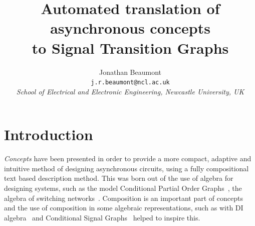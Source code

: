 \documentclass[british,conference,compsoc]{IEEEtran}
\newcommand{\noun}[1]{\textsc{#1}}
\begin{document}
\twocolumn

\title{Automated translation of asynchronous concepts \\
to Signal Transition Graphs}
\author{Jonathan Beaumont\\
\texttt{j.r.beaumont@ncl.ac.uk}\\
\emph{School of Electrical and Electronic Engineering, Newcastle University,
UK}}

\maketitle

%

\sloppy
\thispagestyle{empty}
\section{Introduction}

\emph{Concepts} have been presented in order to provide a more compact, adaptive and intuitive method of
designing asynchronous circuits, using a fully compositional text based description method. 
This was born out of the use of algebra for designing systems,
such as the model Conditional Partial Order Graphs~\cite{CPOG1}\cite{CPOG2}\cite{2014_mokhov_pg},
the algebra of switching networks~\cite{mokhov2015algebra}. Composition is an important part of concepts
 and the use of composition in some algebraic representations, such as with DI algebra~\cite{270632} 
 and Conditional Signal Graphs~\cite{6243877} helped to inspire this. 
\end{document}
